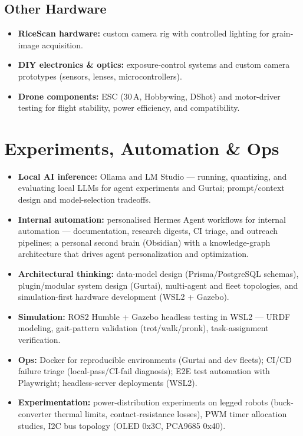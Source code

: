 \documentclass[10pt]{article}
\newcommand{\itemhead}[1]{\textbf{#1}}
\begin{document}
\subsection{Other Hardware}
\begin{itemize}
  \item \itemhead{RiceScan hardware:} custom camera rig with controlled lighting for grain-image acquisition.
  \item \itemhead{DIY electronics \& optics:} exposure-control systems and custom camera prototypes (sensors, lenses, microcontrollers).
  \item \itemhead{Drone components:} ESC (30\,A, Hobbywing, DShot) and motor-driver testing for flight stability, power efficiency, and compatibility.
\end{itemize}

\section{Experiments, Automation \& Ops}
\begin{itemize}
  \item \itemhead{Local AI inference:} Ollama and LM Studio --- running, quantizing, and evaluating local LLMs for agent experiments and Gurtai; prompt/context design and model-selection tradeoffs.
  \item \itemhead{Internal automation:} personalised Hermes Agent workflows for internal automation --- documentation, research digests, CI triage, and outreach pipelines; a personal second brain (Obsidian) with a knowledge-graph architecture that drives agent personalization and optimization.
  \item \itemhead{Architectural thinking:} data-model design (Prisma/PostgreSQL schemas), plugin/modular system design (Gurtai), multi-agent and fleet topologies, and simulation-first hardware development (WSL2 + Gazebo).
  \item \itemhead{Simulation:} ROS2 Humble + Gazebo headless testing in WSL2 --- URDF modeling, gait-pattern validation (trot/walk/pronk), task-assignment verification.
  \item \itemhead{Ops:} Docker for reproducible environments (Gurtai and dev fleets); CI/CD failure triage (local-pass/CI-fail diagnosis); E2E test automation with Playwright; headless-server deployments (WSL2).
  \item \itemhead{Experimentation:} power-distribution experiments on legged robots (buck-converter thermal limits, contact-resistance losses), PWM timer allocation studies, I2C bus topology (OLED 0x3C, PCA9685 0x40).
\end{itemize}
\end{document}
